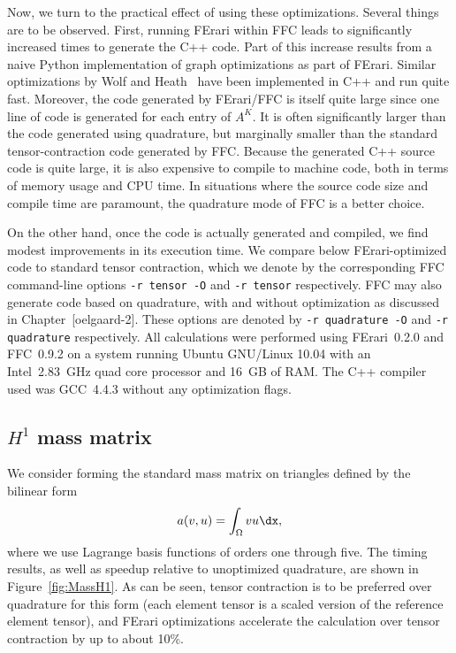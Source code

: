 Now, we turn to the practical effect of using these optimizations.
Several things are to be observed. First, running FErari within FFC
leads to significantly increased times to generate the C++ code. Part
of this increase results from a naive Python implementation of graph
optimizations as part of FErari. Similar optimizations by Wolf and
Heath~\cite{WolfHeath2009} have been implemented in C++ and run quite
fast. Moreover, the code generated by FErari/FFC is itself quite large
since one line of code is generated for each entry of $A^K$. It is
often significantly larger than the code generated using quadrature,
but marginally smaller than the standard tensor-contraction code
generated by FFC. Because the generated C++ source code is quite
large, it is also expensive to compile to machine code, both in terms
of memory usage and CPU time. In situations where the source code
size and compile time are paramount, the quadrature mode of FFC is a
better choice.

On the other hand, once the code is actually generated and compiled,
we find modest improvements in its execution time. We compare below
FErari-optimized code to standard tensor contraction, which we denote
by the corresponding FFC command-line options \texttt{-r tensor -O}
and \texttt{-r tensor} respectively. FFC may also generate code based
on quadrature, with and without optimization as discussed in
Chapter~[oelgaard-2]. These options are denoted by \texttt{-r
quadrature -O} and \texttt{-r quadrature} respectively.  All
calculations were performed using FErari~0.2.0 and FFC~0.9.2 on a
system running Ubuntu GNU/Linux 10.04 with an Intel~2.83~GHz quad core
processor and 16~GB of RAM. The C++ compiler used was GCC~4.4.3 without
any optimization flags.

\subsection{$H^1$ mass matrix}

We consider forming the standard mass matrix on triangles defined by
the bilinear form
\begin{equation} \label{eq:MassH1}
  a(v, u) = \int_{\Omega} v u \dx,
\end{equation}
where we use Lagrange basis functions of orders one through five. The
timing results, as well as speedup relative to unoptimized quadrature,
are shown in Figure~\ref{fig:MassH1}. As can be seen, tensor
contraction is to be preferred over quadrature for this form (each
element tensor is a scaled version of the reference element tensor),
and FErari optimizations accelerate the calculation over tensor
contraction by up to about 10\%.

